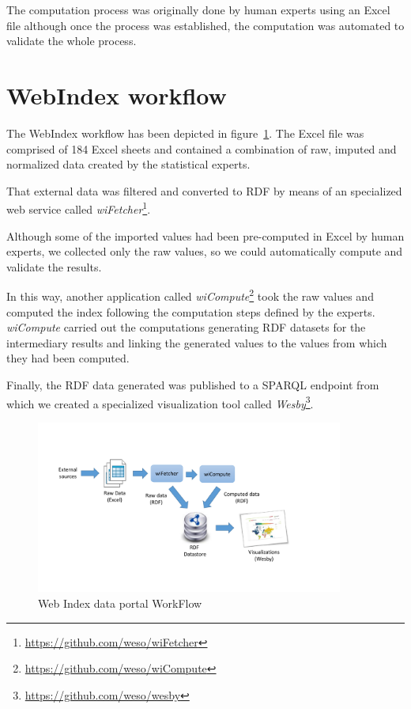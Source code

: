 \documentclass{llncs}
\begin{document}
The computation process was originally done by human experts using an Excel file although
once the process was established, the computation was automated to validate the whole process. 

\section{WebIndex workflow}

The WebIndex workflow has been depicted in figure~\ref{Fig:WebIndexWorkFlow}. 
The Excel file was comprised of 184 Excel sheets and contained a combination
 of raw, imputed and normalized data created by the statistical experts. 

That external data was filtered and converted to RDF by means of an specialized web service called \emph{wiFetcher}\footnote{\url{https://github.com/weso/wiFetcher}}. 

Although some of the imported values had been
 pre-computed in Excel by human experts, we collected only the raw values, so we could automatically compute and validate the results. 

In this way, another application called \emph{wiCompute}\footnote{\url{https://github.com/weso/wiCompute}} 
 took the raw values and computed the index following the
 computation steps defined by the experts. 
\emph{wiCompute} carried out the computations
 generating RDF datasets for the intermediary results and linking the generated values
 to the values from which they had been computed.
 
Finally, the RDF data generated was published to a SPARQL endpoint from which we created
a specialized visualization tool called \emph{Wesby}\footnote{\url{https://github.com/weso/wesby}}.

\begin{figure}[h]
\begin{center}
  \includegraphics[width=0.9\textwidth]{WebIndexWorkFlow}
\end{center}
\caption{Web Index data portal WorkFlow}
\label{Fig:WebIndexWorkFlow}
\end{figure}
\end{document}
